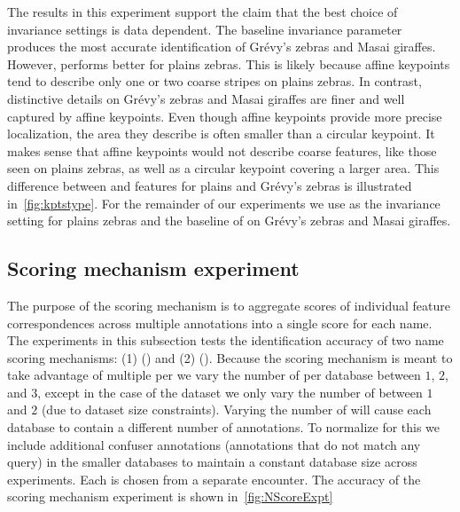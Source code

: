         The results in this experiment support the claim that the best choice of invariance settings is data
          dependent.
        The baseline invariance parameter \AIAlone{} produces the most accurate identification of  Grévy's zebras
          and Masai giraffes.
        However, \QRHCirc{} performs better for plains zebras.
        This is likely because affine keypoints tend to describe only one or two coarse stripes on plains zebras.
        In contrast, distinctive details on Grévy's zebras and Masai giraffes are finer and well captured by
          affine keypoints.
        Even though affine keypoints provide more precise localization, the area they describe is often smaller
          than a circular keypoint.
        It makes sense that affine keypoints would not describe coarse features, like those seen on plains
          zebras, as well as a circular keypoint covering a larger area.
        This difference between \AIAlone{} and  \QRHEll{} features for plains and Grévy's zebras is illustrated
          in~\cref{fig:kptstype}.
        For the remainder of our experiments we use \QRHCirc{} as the invariance setting for plains zebras and
          the baseline of \AIAlone{} on Grévy's zebras and Masai giraffes.

    \subsection{Scoring mechanism experiment}\label{sub:exptscoremech}  

        The purpose of the scoring mechanism is to aggregate scores of individual feature correspondences across
          multiple annotations into a single score for each name.
        The experiments in this subsection tests the identification accuracy of two name scoring mechanisms:
        (1) \cscoring{} (\csum{}) and
        (2) \nscoring{} (\nsum{}).
        Because the scoring mechanism is meant to take advantage of multiple \exemplars{} per \name{} we vary the
          number of \exemplars{} per database \name{} between $1$, $2$, and $3$, except in the case of the
          \girmmasterI{} dataset we only vary the number of \exemplars{} between $1$ and $2$ (due to dataset size
          constraints).
        Varying the number of \exemplars{} will cause each database to contain a different number of annotations.
        To normalize for this we include additional confuser annotations (annotations that do not match any
          query) in the smaller databases to maintain a constant database size across experiments.
        Each \exemplar{} is chosen from a separate encounter.
        The accuracy of the scoring mechanism experiment is shown in~\cref{fig:NScoreExpt}

